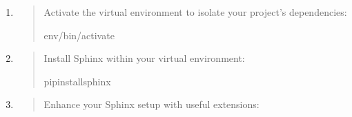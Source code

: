 \documentclass[a4paper,10pt,english]{sphinxmanual}
\begin{document}
\begin{enumerate}
\begin{quote}
\begin{itemize}
\end{itemize}

\begin{sphinxVerbatim}[commandchars=\\\{\}]
python3\PYGZhy{}mvenvenv
\end{sphinxVerbatim}
\begin{itemize}
\item {} 
\sphinxAtStartPar
To use  (requires separate installation):

\end{itemize}

\begin{sphinxVerbatim}[commandchars=\\\{\}]
python3.10\PYGZhy{}mvirtualenvenv
\end{sphinxVerbatim}
\end{quote}

\item {} 
\sphinxAtStartPar
{}
\begin{quote}

\sphinxAtStartPar
Activate the virtual environment to isolate your project’s dependencies:

\begin{sphinxVerbatim}[commandchars=\\\{\}]
env/bin/activate
\end{sphinxVerbatim}
\end{quote}

\item {} 
\sphinxAtStartPar
{}
\begin{quote}

\sphinxAtStartPar
Install Sphinx within your virtual environment:

\begin{sphinxVerbatim}[commandchars=\\\{\}]
pipinstallsphinx
\end{sphinxVerbatim}
\end{quote}

\item {} 
\sphinxAtStartPar
{}
\begin{quote}

\sphinxAtStartPar
Enhance your Sphinx setup with useful extensions:


\end{quote}
\end{enumerate}
\end{document}
